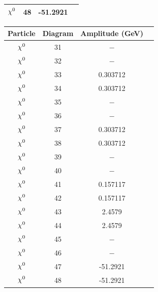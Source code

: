 \documentclass[11pt]{article}
\newcommand{\mychibig}{\raisebox{0pt}[1ex][1ex]{$\chi$}}
\begin{document}
\begin{table}[h!]
\begin{tabular}{c c c c}
$\mychibig^0$ & 48 & -51.2921 \\ 
\hline\end{tabular}
\begin{tabular}{c c c c}
Particle & Diagram & Amplitude (GeV) \\
\hline
$\mychibig^0$ & 31 & $-$ \\ 
$\mychibig^0$ & 32 & $-$ \\ 
$\mychibig^0$ & 33 & 0.303712 \\ 
$\mychibig^0$ & 34 & 0.303712 \\ 
$\mychibig^0$ & 35 & $-$ \\ 
$\mychibig^0$ & 36 & $-$ \\ 
$\mychibig^0$ & 37 & 0.303712 \\ 
$\mychibig^0$ & 38 & 0.303712 \\ 
$\mychibig^0$ & 39 & $-$ \\ 
$\mychibig^0$ & 40 & $-$ \\ 
$\mychibig^0$ & 41 & 0.157117 \\ 
$\mychibig^0$ & 42 & 0.157117 \\ 
$\mychibig^0$ & 43 & 2.4579 \\ 
$\mychibig^0$ & 44 & 2.4579 \\ 
$\mychibig^0$ & 45 & $-$ \\ 
$\mychibig^0$ & 46 & $-$ \\ 
$\mychibig^0$ & 47 & -51.2921 \\ 
$\mychibig^0$ & 48 & -51.2921 \\ 
\hline\end{tabular}
\end{table}
\end{document}
